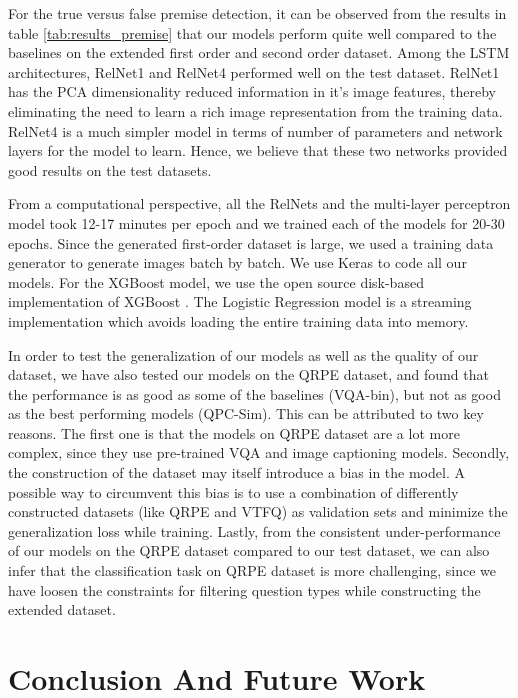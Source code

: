 For the true versus false premise detection, it can be observed from the results in table \ref{tab:results_premise} that our models perform quite well compared to the baselines on the extended first order and second order dataset. Among the LSTM architectures, RelNet1 and RelNet4 performed well on the test dataset. RelNet1 has the PCA dimensionality reduced information in it's image features, thereby eliminating the need to learn a rich image representation from the training data. RelNet4 is a much simpler model in terms of number of parameters and network layers for the model to learn. Hence, we believe that these two networks provided good results on the test datasets.

From a computational perspective, all the RelNets and the multi-layer perceptron model took 12-17 minutes per epoch and we trained each of the models for 20-30 epochs. Since the generated first-order dataset is large, we used a training data generator to generate images batch by batch. We use Keras to code all our models. For the XGBoost model, we use the open source disk-based implementation of XGBoost \cite{chen2016xgboost}. The Logistic Regression model is a streaming implementation which avoids loading the entire training data into memory.

In order to test the generalization of our models as well as the quality of our dataset, we have also tested our models on the QRPE dataset, and found that the performance is as good as some of the baselines (VQA-bin), but not as good as the best performing models (QPC-Sim). This can be attributed to two key reasons. The first one is that the models on QRPE dataset are a lot more complex, since they use pre-trained VQA and image captioning models. Secondly, the construction of the dataset may itself introduce a bias in the model. A possible way to circumvent this bias is to use a combination of differently constructed datasets (like QRPE and VTFQ) as validation sets and minimize the generalization loss while training. Lastly, from the consistent under-performance of our models on the QRPE dataset compared to our test dataset, we can also infer that the classification task on QRPE dataset is more challenging, since we have loosen the constraints for filtering question types while constructing the extended dataset.

\section{Conclusion And Future Work}

